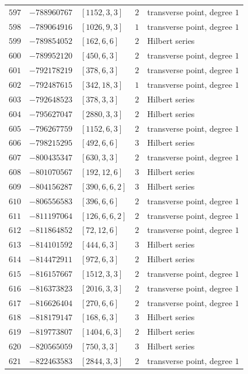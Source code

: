 \documentclass[11pt]{article}
\begin{document}
\begin{center}
\begin{longtable}{r r l c l}
$597$ & $-788960767$ & $[1152,3,3]$ & $2$ & transverse point, degree $1$\\
$598$ & $-789064916$ & $[1026,9,3]$ & $1$ & transverse point, degree $1$\\
$599$ & $-789854052$ & $[162,6,6]$ & $2$ & Hilbert series\\
$600$ & $-789952120$ & $[450,6,3]$ & $2$ & transverse point, degree $1$\\
$601$ & $-792178219$ & $[378,6,3]$ & $2$ & transverse point, degree $1$\\
$602$ & $-792487615$ & $[342,18,3]$ & $1$ & transverse point, degree $1$\\
$603$ & $-792648523$ & $[378,3,3]$ & $2$ & Hilbert series\\
$604$ & $-795627047$ & $[2880,3,3]$ & $2$ & Hilbert series\\
$605$ & $-796267759$ & $[1152,6,3]$ & $2$ & transverse point, degree $1$\\
$606$ & $-798215295$ & $[492,6,6]$ & $3$ & Hilbert series\\
$607$ & $-800435347$ & $[630,3,3]$ & $2$ & transverse point, degree $1$\\
$608$ & $-801070567$ & $[192,12,6]$ & $3$ & Hilbert series\\
$609$ & $-804156287$ & $[390,6,6,2]$ & $3$ & Hilbert series\\
$610$ & $-806556583$ & $[396,6,6]$ & $2$ & transverse point, degree $1$\\
$611$ & $-811197064$ & $[126,6,6,2]$ & $2$ & transverse point, degree $1$\\
$612$ & $-811864852$ & $[72,12,6]$ & $2$ & transverse point, degree $1$\\
$613$ & $-814101592$ & $[444,6,3]$ & $3$ & Hilbert series\\
$614$ & $-814472911$ & $[972,6,3]$ & $2$ & Hilbert series\\
$615$ & $-816157667$ & $[1512,3,3]$ & $2$ & transverse point, degree $1$\\
$616$ & $-816373823$ & $[2016,3,3]$ & $2$ & transverse point, degree $1$\\
$617$ & $-816626404$ & $[270,6,6]$ & $2$ & transverse point, degree $1$\\
$618$ & $-818179147$ & $[168,6,3]$ & $3$ & Hilbert series\\
$619$ & $-819773807$ & $[1404,6,3]$ & $2$ & Hilbert series\\
$620$ & $-820565059$ & $[750,3,3]$ & $3$ & Hilbert series\\
$621$ & $-822463583$ & $[2844,3,3]$ & $2$ & transverse point, degree $1$\\

\end{longtable}
\end{center}
\end{document}
